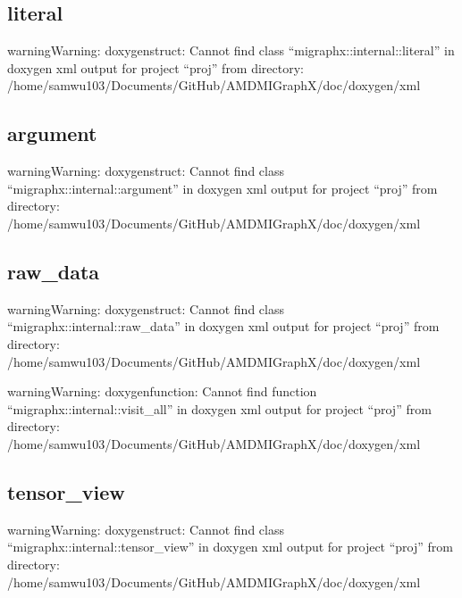 \documentclass[letterpaper,10pt,english]{sphinxmanual}
\begin{document}
\subsection{literal}
\label{\detokenize{dev/data:literal}}
\begin{sphinxadmonition}{warning}{Warning:}
\sphinxAtStartPar
doxygenstruct: Cannot find class “migraphx::internal::literal” in doxygen xml output for project “proj” from directory: /home/samwu103/Documents/GitHub/AMDMIGraphX/doc/doxygen/xml
\end{sphinxadmonition}


\subsection{argument}
\label{\detokenize{dev/data:argument}}
\begin{sphinxadmonition}{warning}{Warning:}
\sphinxAtStartPar
doxygenstruct: Cannot find class “migraphx::internal::argument” in doxygen xml output for project “proj” from directory: /home/samwu103/Documents/GitHub/AMDMIGraphX/doc/doxygen/xml
\end{sphinxadmonition}


\subsection{raw\_data}
\label{\detokenize{dev/data:raw-data}}
\begin{sphinxadmonition}{warning}{Warning:}
\sphinxAtStartPar
doxygenstruct: Cannot find class “migraphx::internal::raw\_data” in doxygen xml output for project “proj” from directory: /home/samwu103/Documents/GitHub/AMDMIGraphX/doc/doxygen/xml
\end{sphinxadmonition}

\begin{sphinxadmonition}{warning}{Warning:}
\sphinxAtStartPar
doxygenfunction: Cannot find function “migraphx::internal::visit\_all” in doxygen xml output for project “proj” from directory: /home/samwu103/Documents/GitHub/AMDMIGraphX/doc/doxygen/xml
\end{sphinxadmonition}


\subsection{tensor\_view}
\label{\detokenize{dev/data:tensor-view}}
\begin{sphinxadmonition}{warning}{Warning:}
\sphinxAtStartPar
doxygenstruct: Cannot find class “migraphx::internal::tensor\_view” in doxygen xml output for project “proj” from directory: /home/samwu103/Documents/GitHub/AMDMIGraphX/doc/doxygen/xml
\end{sphinxadmonition}
\end{document}
